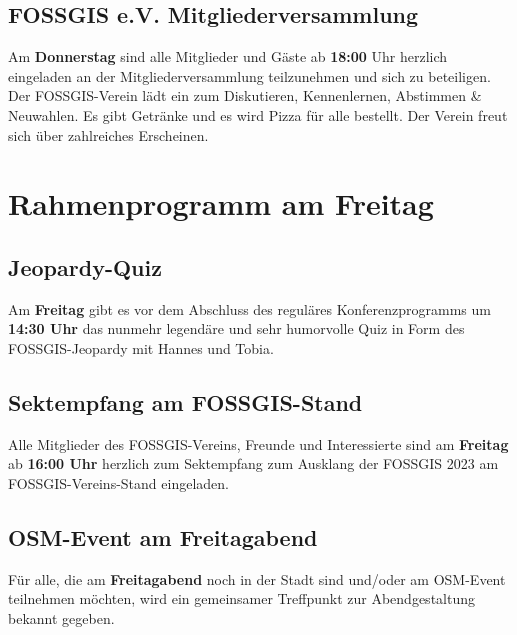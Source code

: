 \subsection*{FOSSGIS e.V. Mitgliederversammlung}
Am {\bfseries Donnerstag} sind alle Mitglieder und Gäste ab {\bfseries 18:00} Uhr herzlich eingeladen an der Mitgliederversammlung teilzunehmen und sich zu beteiligen. Der FOSSGIS-Verein lädt ein zum Diskutieren, Kennenlernen, Abstimmen \& Neuwahlen. Es gibt Getränke und es wird Pizza für alle bestellt. Der Verein freut sich über zahlreiches Erscheinen.

\section*{Rahmenprogramm am Freitag}
\subsection*{Jeopardy-Quiz}
Am {\bfseries Freitag} gibt es vor dem Abschluss des reguläres Konferenzprogramms um {\bfseries 14:30 Uhr} das nunmehr legendäre und sehr humorvolle Quiz in Form des FOSSGIS-Jeopardy mit Hannes und Tobia.

\subsection*{Sektempfang am FOSSGIS-Stand}
Alle Mitglieder des FOSSGIS-Vereins, Freunde und Interessierte sind am {\bfseries Freitag} ab {\bfseries 16:00 Uhr} herzlich zum Sektempfang zum Ausklang der FOSSGIS 2023 am FOSSGIS-Vereins-Stand eingeladen.

\subsection*{OSM-Event am Freitagabend}
Für alle, die am {\bfseries Freitagabend} noch in der Stadt sind und/oder am OSM-Event teilnehmen möchten, wird ein gemeinsamer Treffpunkt zur Abendgestaltung bekannt gegeben.

\newpage

\newpage

\newpage

\newpage

\newpage

\newpage

